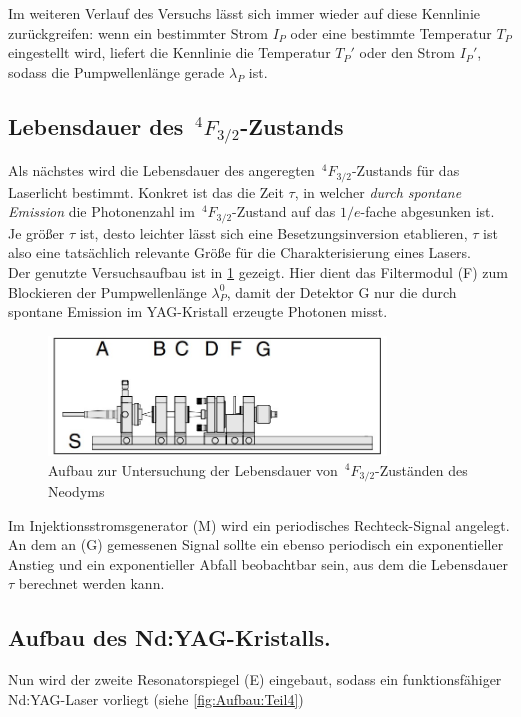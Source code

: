\documentclass[../main.tex]{subfiles}
\begin{document}
        Im weiteren Verlauf des Versuchs lässt sich immer wieder auf diese Kennlinie zurückgreifen: wenn ein bestimmter Strom $I_P$ oder eine bestimmte Temperatur $T_P$ eingestellt wird, liefert die Kennlinie die Temperatur $T_P'$ oder den Strom $I_P'$, sodass die Pumpwellenlänge gerade $\lambda_P$ ist.

    \subsection{Lebensdauer des $\,^4F_{3/2}$-Zustands}
        Als nächstes wird die Lebensdauer des angeregten $\,^4F_{3/2}$-Zustands für das Laserlicht bestimmt. Konkret ist das die Zeit $\tau$, in welcher \textit{durch spontane Emission} die Photonenzahl im $\,^4F_{3/2}$-Zustand auf das $1/e$-fache abgesunken ist. Je größer $\tau$ ist, desto leichter lässt sich eine Besetzungsinversion etablieren, $\tau$ ist also eine tatsächlich relevante Größe für die Charakterisierung eines Lasers.\\

        Der genutzte Versuchsaufbau ist in \ref{fig:Aufbau:Teil2} gezeigt. Hier dient das Filtermodul (F) zum Blockieren der Pumpwellenlänge $\lambda_P^{0}$, damit der Detektor G nur die durch spontane Emission im YAG-Kristall erzeugte Photonen misst.

        \begin{figure}[H]
            \centering
            \includegraphics[width=0.8\textwidth]{Bilddateien/Versuchsaufbau/Teil2.jpg}
            \caption{Aufbau zur Untersuchung der Lebensdauer von $\,^4F_{3/2}$-Zuständen des Neodyms}
            \label{fig:Aufbau:Teil2}
        \end{figure}    

        Im Injektionsstromsgenerator (M) wird ein periodisches Rechteck-Signal angelegt. An dem an (G) gemessenen Signal sollte ein ebenso periodisch ein exponentieller Anstieg und ein exponentieller Abfall beobachtbar sein, aus dem die Lebensdauer $\tau$ berechnet werden kann.  

    \subsection{Aufbau des Nd:YAG-Kristalls.}
        Nun wird der zweite Resonatorspiegel (E) eingebaut, sodass ein funktionsfähiger Nd:YAG-Laser vorliegt (siehe \ref{fig:Aufbau:Teil4})
\end{document}

